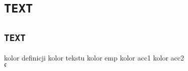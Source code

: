 \documentclass{article}
\newcommand{\cont}{\mathfrak{c}}
\begin{document}
\pagecolor{back}\color{text}\ttfamily

\section*{\color{tit}\texttt{TEXT}}
\subsection*{\color{tit}\texttt{TEXT}}
    \color{def}kolor definicji \color{text}kolor tekstu \color{emp}kolor emp \color{acc1}kolor acc1 \color{acc2}kolor acc2\\
    $\cont$
\end{document}
